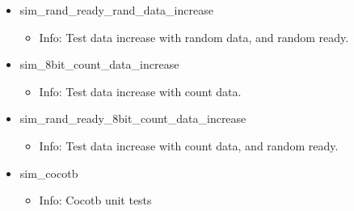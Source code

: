 \begin{itemize}
\begin{itemize}
	\item[$\space$] Info: Test data increase with random data.
	\end{itemize}
\item sim\_rand\_ready\_rand\_data\_increase
	\begin{itemize}
	\item[$\space$] Info: Test data increase with random data, and random ready.
	\end{itemize}
\item sim\_8bit\_count\_data\_increase
	\begin{itemize}
	\item[$\space$] Info: Test data increase with count data.
	\end{itemize}
\item sim\_rand\_ready\_8bit\_count\_data\_increase
	\begin{itemize}
	\item[$\space$] Info: Test data increase with count data, and random ready.
	\end{itemize}
\item sim\_cocotb
	\begin{itemize}
	\item[$\space$] Info: Cocotb unit tests
	\end{itemize}
\end{itemize}

